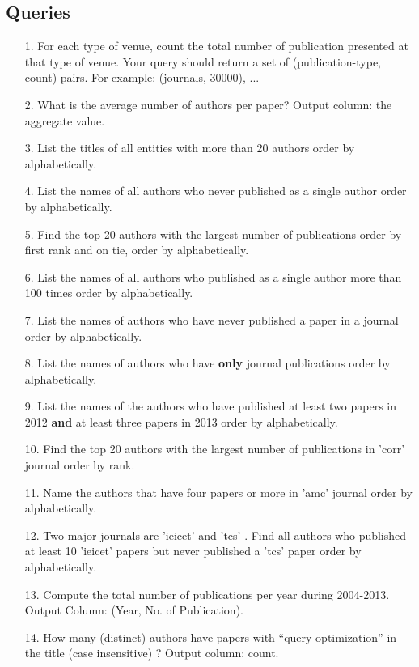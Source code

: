 \documentclass[10pt]{article}
\begin{document}
\subsection{Queries}

\begin{enumerate}
\item
[1.] For each type of venue, count the total number of publication presented at that type of venue. Your query should return a set of (publication-type, count) pairs. For example: (journals, 30000), ... 
\item
[2.] What is the average number of authors per paper? Output column: the aggregate value.
\item
[3.] List the titles of all entities with more than 20 authors order by alphabetically. 
\item
[4.] List the names of all authors who never published as a single author order by alphabetically.
\item
[5.] Find the top 20 authors with the largest number of publications order by first rank and on tie, order by alphabetically.
\item
[6.] List the names of all authors who published as a single author more than 100 times order by alphabetically.
\item
[7.] List the names of authors who have never published a paper in a journal order by alphabetically.
\item
[8.] List the names of authors who have \textbf{only} journal publications order by alphabetically.
\item
[9.] List the names of the authors who have published at least two papers in 2012 \textbf{and} at least three papers in 2013 order by alphabetically.
\item
[10.] Find the top 20 authors with the largest number of publications in 'corr' journal order by rank.
\item
[11.] Name the authors that have four papers or more in 'amc' journal order by alphabetically.
\item
[12.] Two major journals are 'ieicet' and 'tcs' . Find all authors who published at least 10 'ieicet' papers but never published a 'tcs' paper order by alphabetically.
\item
[13.] Compute the total number of publications per year during 2004-2013. Output Column: (Year, No. of Publication).
\item
[14.] How many (distinct) authors have papers with “query optimization” in the title (case insensitive) ? Output column: count. 

\end{enumerate}
\end{document}
